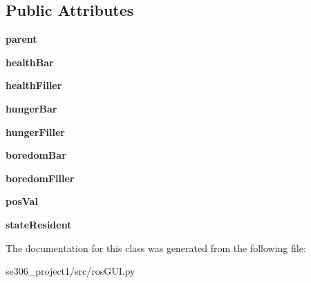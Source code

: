 \subsection*{Public Attributes}
\begin{DoxyCompactItemize}
\item 
\hypertarget{classrosGUI_1_1ros__gui_ac0f9ef4869c1ab2000e84e6cb561709d}{{\bfseries parent}}\label{classrosGUI_1_1ros__gui_ac0f9ef4869c1ab2000e84e6cb561709d}

\item 
\hypertarget{classrosGUI_1_1ros__gui_a0b33da1d02d080ce67d5299168068044}{{\bfseries health\-Bar}}\label{classrosGUI_1_1ros__gui_a0b33da1d02d080ce67d5299168068044}

\item 
\hypertarget{classrosGUI_1_1ros__gui_a0c0e884fb3adf543064604a43a0920c2}{{\bfseries health\-Filler}}\label{classrosGUI_1_1ros__gui_a0c0e884fb3adf543064604a43a0920c2}

\item 
\hypertarget{classrosGUI_1_1ros__gui_a528931d908c4d72c307bf1f559efac5a}{{\bfseries hunger\-Bar}}\label{classrosGUI_1_1ros__gui_a528931d908c4d72c307bf1f559efac5a}

\item 
\hypertarget{classrosGUI_1_1ros__gui_a20aa4aff7210fbe8a4c5a12beb86d1ee}{{\bfseries hunger\-Filler}}\label{classrosGUI_1_1ros__gui_a20aa4aff7210fbe8a4c5a12beb86d1ee}

\item 
\hypertarget{classrosGUI_1_1ros__gui_af2662950f1e429e25656ad60db742199}{{\bfseries boredom\-Bar}}\label{classrosGUI_1_1ros__gui_af2662950f1e429e25656ad60db742199}

\item 
\hypertarget{classrosGUI_1_1ros__gui_a810b52b8e2c517efab7b8b0d1796dbaf}{{\bfseries boredom\-Filler}}\label{classrosGUI_1_1ros__gui_a810b52b8e2c517efab7b8b0d1796dbaf}

\item 
\hypertarget{classrosGUI_1_1ros__gui_a1150c1d22b7c1e48bbdd53d339beb0b8}{{\bfseries pos\-Val}}\label{classrosGUI_1_1ros__gui_a1150c1d22b7c1e48bbdd53d339beb0b8}

\item 
\hypertarget{classrosGUI_1_1ros__gui_af6bcd76c1a8d35589c3c4336d822cb5d}{{\bfseries state\-Resident}}\label{classrosGUI_1_1ros__gui_af6bcd76c1a8d35589c3c4336d822cb5d}

\end{DoxyCompactItemize}


The documentation for this class was generated from the following file\-:\begin{DoxyCompactItemize}
\item 
se306\-\_\-project1/src/ros\-G\-U\-I.\-py\end{DoxyCompactItemize}
